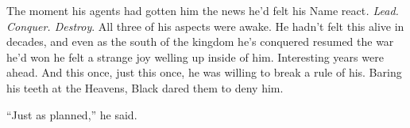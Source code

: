 \documentclass[12pt, openany]{book}
\begin{document}
The moment his agents had gotten him the news he’d felt his Name react\textit{. Lead. Conquer. Destroy}. All three of his aspects were awake. He hadn’t felt this alive in decades, and even as the south of the kingdom he’s conquered resumed the war he’d won he felt a strange joy welling up inside of him. Interesting years were ahead. And this once, just this once, he was willing to break a rule of his. Baring his teeth at the Heavens, Black dared them to deny him.

“Just as planned,” he said.
\clearpage
\end{document}
